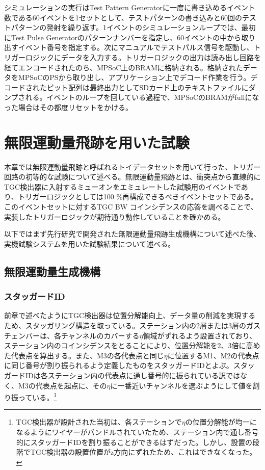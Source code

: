 シミュレーションの実行はTest Pattern Generatorに一度に書き込めるイベント数である60イベントを1セットとして、テストパターンの書き込みと60回のテストパターンの発射を繰り返す。1イベントのシミュレーションループでは、最初にTest Pulse Generatorのパターンナンバーを指定し、60イベントの中から取り出すイベント番号を指定する。次にマニュアルでテストパルス信号を駆動し、トリガーロジックにデータを入力する。トリガーロジックの出力は読み出し回路を経てエンコードされたのち、MPSoC上のBRAMに格納される。格納されたデータをMPSoCのPSから取り出し、アプリケーション上でデコード作業を行う。デコードされたビット配列は最終出力としてSDカード上のテキストファイルにダンプされる。イベントのループを回している過程で、MPSoCのBRAMがfullになった場合はその都度リセットをかける。

\section{無限運動量飛跡を用いた試験}
\label{sec_IMT}

本章では無限運動量飛跡と呼ばれるトイデータセットを用いて行った、トリガー回路の初等的な試験について述べる。無限運動量飛跡とは、衝突点から直線的にTGC検出器に入射するミューオンをエミュレートした試験用のイベントであり、トリガーロジックとしては100 \%再構成できるべきイベントセットである。このイベントセットに対するTGC BW コインシデンスの応答を調べることで、実装したトリガーロジックが期待通り動作していることを確かめる。

以下ではまず先行研究で開発された無限運動量飛跡生成機構について述べた後、実機試験システムを用いた試験結果について述べる。

\subsection{無限運動量生成機構}
\label{subsec_IMT_generation}

\subsubsection{スタッガードID}
前章で述べたようにTGC検出器は位置分解能向上、データ量の削減を実現するため、スタッガリング構造を取っている。ステーション内の2層または3層のガスチェンバーは、各チャンネルのカバーする$\eta$領域がずれるよう設置されており、ステーション内のコインシデンスをとることにより、位置分解能を2、3倍に高めた代表点を算出する。また、M3の各代表点と同じ$\eta$に位置するM1、M2の代表点に同じ番号が割り振られるよう定義したものをスタッガードIDとよぶ。スタッガードIDは各ステーション内の代表点に通し番号的に振られている訳ではなく、M3の代表点を起点に、その$\eta$に一番近いチャンネルを選ぶようにして値を割り振っている。\footnote{TGC検出器が設計された当初は、各ステーションで$\eta$の位置分解能が均一になるようにワイヤーがバンドルされていたため、ステーション内で通し番号的にスタッガードIDを割り振ることができるはずだった。しかし、設置の段階でTGC検出器の設置位置がz方向にずれたため、これはできなくなった。}

